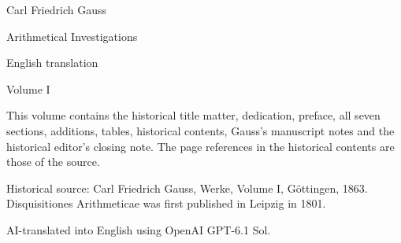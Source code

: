 \begin{titlepage}
\centering
\vspace*{1cm}
{\Large Carl Friedrich Gauss\par}
\bigskip
{\huge Arithmetical Investigations\par}
\bigskip
{\Large English translation\par}
\medskip
{\large Volume I\par}
\vfill
\begin{minipage}{0.90\linewidth}
\small
This volume contains the historical title matter, dedication, preface, all seven sections, additions, tables, historical contents, Gauss's manuscript notes and the historical editor's closing note. The page references in the historical contents are those of the source.

Historical source: Carl Friedrich Gauss, Werke, Volume I, Göttingen, 1863. Disquisitiones Arithmeticae was first published in Leipzig in 1801.

AI-translated into English using OpenAI GPT-6.1 Sol.
\end{minipage}
\end{titlepage}
